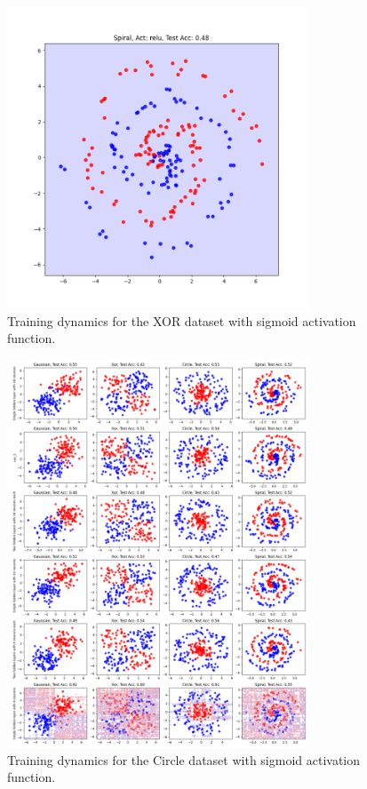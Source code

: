 \documentclass{article} %
\begin{document}
\begin{figure}[h]
    \centering
    \includegraphics[width=0.8\textwidth]{test.png}
    \caption{Training dynamics for the XOR dataset with sigmoid activation function.}
    \label{fig:xor_sigmoid}
\end{figure}

\begin{figure}[h]
    \centering
    \includegraphics[width=0.8\textwidth]{generated_images.png}
    \caption{Training dynamics for the Circle dataset with sigmoid activation function.}
    \label{fig:circle_sigmoid}
\end{figure}
\end{document}
